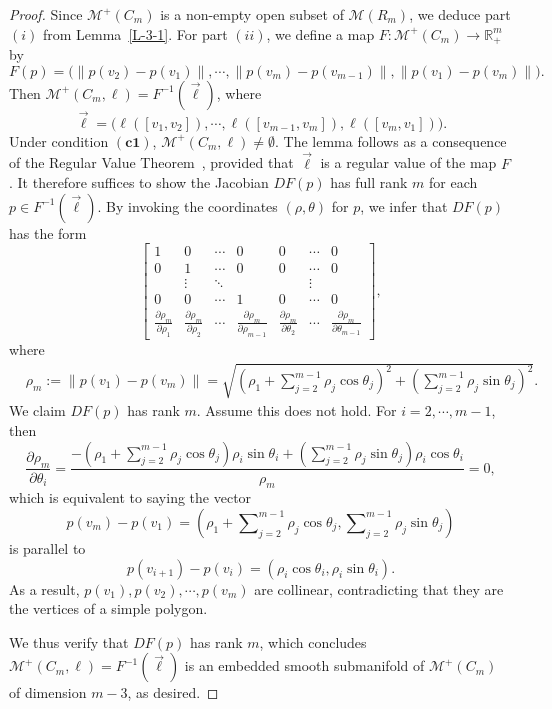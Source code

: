 \documentclass[11pt,letterpaper]{amsart}
\theoremstyle{plain}
\theoremstyle{definition}
\theoremstyle{remark}
\numberwithin{equation}{section}
\begin{document}
\begin{proof}
Since $\mathcal M^{+}(C_m)$ is a non-empty open subset of $\mathcal M(R_m)$, we deduce part $(i)$ from Lemma~\ref{L-3-1}. For part $(ii)$, we define a map $F:\mathcal M^{+}(C_m)\to \mathbb R_{+}^{m}$ by
\[
F(p)=\big(\|p(v_2)-p(v_1)\|,\cdots,\|p(v_m)-p(v_{m-1})\|,\|p(v_1)-p(v_m)\|\big).
\]
Then $\mathcal M^{+}(C_m,\ell)=F^{-1}(\vec{\ell})$, where
\[
\vec{\ell}=\big(\ell([v_1,v_2]),\cdots,\ell([v_{m-1},v_m]),\ell([v_{m},v_1])\big).
\]
Under condition $\mathrm{\mathbf{(c1)}}$, $\mathcal M^{+}(C_m,\ell)\neq \emptyset$. The lemma follows as a consequence of the Regular Value Theorem~\cite{Lee-2018}, provided that $\vec{\ell}$  is a regular value of the map $F$. It therefore suffices to show the Jacobian $DF(p)$ has full rank $m$ for each $p\in F^{-1}(\vec{\ell})$. By invoking the coordinates $(\rho,\theta)$ for $p$, we infer that $DF(p)$ has the form
\[
\left[\begin{array}{ccccccc}
1 & 0  & \cdots & 0 & 0 & \cdots & 0\\
0 & 1  & \cdots & 0 & 0 & \cdots & 0\\
& \vdots  & \ddots &   & & \vdots & \\
0 & 0  & \cdots & 1 & 0 & \cdots & 0 \\
\frac{\partial\rho_m}{\partial\rho_1} & \frac{\partial\rho_m}{\partial\rho_2}
& \cdots & \frac{\partial\rho_m}{\partial\rho_{m-1}} & \frac{\partial\rho_m}{\partial\theta_2}
& \cdots & \frac{\partial\rho_m}{\partial\theta_{m-1}}
\end{array}\right],
\]
where
\[
\begin{aligned}
&\rho_m:=\|p(v_1)-p(v_m)\|
=\sqrt{\left(\rho_1+\sum\nolimits_{j=2}^{m-1}
\rho_j\cos\theta_j\right)^2
+\left(\sum\nolimits_{j=2}^{m-1}\rho_j\sin\theta_j\right)^2}.
\end{aligned}
\]
We claim $DF(p)$ has rank $m$. Assume this does not hold. For $i=2,\cdots,m-1$, then
\[
\frac{\partial\rho_m}{\partial\theta_i}=
\frac{-\left(\rho_1+\sum\nolimits_{j=2}^{m-1}
\rho_j\cos\theta_j\right)\rho_i\sin\theta_i
+\left(\sum\nolimits_{j=2}^{m-1}\rho_j\sin\theta_j\right)
\rho_i\cos\theta_i}{\rho_m}=0,
\]
which is equivalent to saying the vector
\[
p(v_m)-p(v_1)
=\left(\rho_1+\sum\nolimits_{j=2}^{m-1}\rho_j\cos\theta_j,
\sum\nolimits_{j=2}^{m-1}\rho_j\sin\theta_j\right)
\]
is parallel to
\[
p(v_{i+1})-p(v_i)=\left(\rho_i\cos\theta_i,\rho_i\sin\theta_i\right).
\]
As a result, $p(v_1),p(v_2),\cdots,p(v_m)$ are collinear, contradicting that they are the vertices of a simple polygon.

We thus verify that $DF(p)$ has rank $m$, which concludes
 $\mathcal M^{+}(C_m,\ell)=F^{-1}(\vec{\ell})$ is an embedded smooth submanifold of $\mathcal M^{+}(C_m)$ of dimension $m-3$, as desired.
\end{proof}
\end{document}
